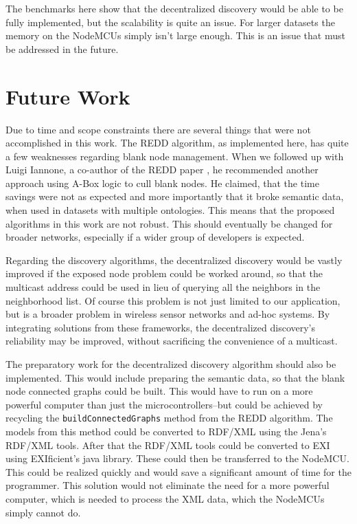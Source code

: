 The benchmarks here show that the decentralized discovery would be able to be fully implemented, but the scalability is quite an issue. For larger datasets the memory on the NodeMCUs simply isn't large enough. This is an issue that must be addressed in the future.


\section{Future Work}

Due to time and scope constraints there are several things that were not accomplished in this work. The REDD algorithm, as implemented here, has quite a few weaknesses regarding blank node management. When we followed up with Luigi Iannone, a co-author of the REDD paper \cite{Esposito.2005}, he recommended another approach using A-Box logic to cull blank nodes. He claimed, that the time savings were not as expected and more importantly that it broke semantic data, when used in datasets with multiple ontologies. This means that the proposed algorithms in this work are not robust. This should eventually be changed for broader networks, especially if a wider group of developers is expected.

Regarding the discovery algorithms, the decentralized discovery would be vastly improved if the exposed node problem could be worked around, so that the multicast address could be used in lieu of querying all the neighbors in the neighborhood list. Of course this problem is not just limited to our application, but is a broader problem in wireless sensor networks and ad-hoc systems. By integrating solutions from these frameworks, the decentralized discovery's reliability may be improved, without sacrificing the convenience of a multicast. 

The preparatory work for the decentralized discovery algorithm should also be implemented. This would include preparing the semantic data, so that the blank node connected graphs could be built. This would have to run on a more powerful computer than just the microcontrollers--but could be achieved by recycling the \texttt{buildConnectedGraphs} method from the REDD algorithm. The models from this method could be converted to RDF/XML using the Jena's RDF/XML tools. After that the RDF/XML tools could be converted to EXI using EXIficient's java library. These could then be transferred to the NodeMCU. This could be realized quickly and would save a significant amount of time for the programmer. This solution would not eliminate the need for a more powerful computer, which is needed to process the XML data, which the NodeMCUs simply cannot do.

